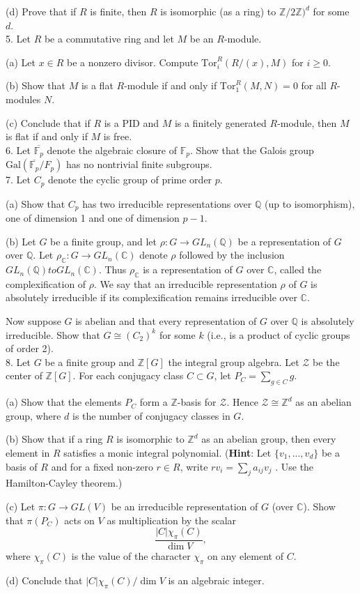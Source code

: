 \documentclass[11pt]{article}
\newcommand{\Z}{\mathbb{Z}}
\newcommand{\Q}{\mathbb{Q}}
\newcommand{\F}{\mathbb{F}}
\newcommand{\C}{\mathbb{C}}
\begin{document}
(d) Prove that if $R$ is finite, then $R$ is isomorphic (as a ring) to $\Z/2\Z)^d$ for some $d$.\\

5. Let $R$ be a commutative ring and let $M$ be an $R$-module.

(a) Let $x \in R$ be a nonzero divisor. Compute $\mbox{Tor}_i^R(R/(x), M)$  for $i \ge 0$.

(b) Show that $M$ is a flat $R$-module if and only if $\mbox{Tor}^R_1(M,N) = 0$ for all $R$-modules $N$.

(c) Conclude that if $R$ is a PID and $M$ is a finitely generated $R$-module, then $M$ is
flat if and only if $M$ is free.\\

6. Let $\overline{\F_p}$ denote the algebraic closure of $\F_p$. Show that the Galois group $\mbox{Gal}(\overline{\F_p}/F_p)$ has
no nontrivial finite subgroups.\\

7. Let $C_p$ denote the cyclic group of prime order $p$.

(a) Show that $C_p$ has two irreducible representations over $\Q$ (up to isomorphism),
one of dimension 1 and one of dimension $p- 1$.

(b) Let $G$ be a finite group, and let $\rho : G\to GL_n(\Q)$ be a representation of $G$
over $\Q$. Let $ρ_\C : G \to GL_n(\C)$ denote $\rho$ followed by the inclusion $GL_n(\Q) to 
GL_n(\C)$. Thus $\rho_\C$ is a representation of $G$ over $\C$, called the complexification of
$\rho$. We say that an irreducible representation $\rho$ of $G$ is absolutely irreducible if its
complexification remains irreducible over $\C.$

Now suppose $G$ is abelian and that every representation of $G$ over $\Q$ is absolutely
irreducible. Show that $G \cong  (C_2)^k$
for some $k$ (i.e., is a product of cyclic groups
of order 2).\\

8. Let $G$ be a finite group and $\Z[G]$ the integral group algebra. Let $\mathcal Z$ be the center of
$\Z[G]$. For each conjugacy class $C\subset G$, let $P_C = \sum_{g\in C} g$. 

(a) Show that the elements $P_C$ form a $\Z$-basis for $\mathcal Z$. Hence $\mathcal Z\cong \Z^d$ as an abelian
group, where $d$ is the number of conjugacy classes in $G$.

(b) Show that if a ring $R$ is isomorphic to $\Z^d$ as an abelian group, then every element
in $R$ satisfies a monic integral polynomial. (\textbf{Hint}: Let $\{v_1, . . . , v_d\}$ be a basis of
$R$ and for a fixed non-zero $r\in R$, write $rv_i = \sum_j a_{ij} v_j$
. Use the Hamilton-Cayley
theorem.)

(c) Let $\pi : G \to GL(V )$ be an irreducible representation of $G$ (over $\C$). Show that
$\pi(P_C)$ acts on $V$ as multiplication by the scalar\[
\frac{|C|\chi_\pi(C)}{\dim V},\]
where $\chi_\pi(C)$  is the value of the character $\chi_\pi$ on any element of $C$.

(d) Conclude that $|C|\chi_\pi(C)/ \dim V$ is an algebraic integer.
\end{document}

